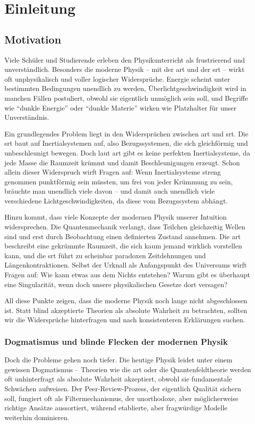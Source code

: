 \chapter{Einleitung}
\section{Motivation}
Viele Schüler und Studierende erleben den Physikunterricht als frustrierend und unverständlich. Besonders die moderne Physik – mit der \gls{art}
und der \gls{srt} – wirkt oft unphysikalisch und voller logischer Widersprüche. Energie scheint unter bestimmten Bedingungen unendlich zu werden,
Überlichtgeschwindigkeit wird in manchen Fällen postuliert, obwohl sie eigentlich unmöglich sein soll, und Begriffe wie \enquote{dunkle Energie} oder \enquote{dunkle Materie} wirken wie
Platzhalter für unser Unverständnis.

Ein grundlegendes Problem liegt in den Widersprüchen zwischen \gls{art} und \gls{srt}. Die \gls{srt} baut auf Inertialsystemen auf, also Bezugssystemen, die sich gleichförmig und unbeschleunigt
bewegen. Doch laut \gls{art} gibt es keine perfekten Inertialsysteme, da jede Masse die Raumzeit krümmt und damit Beschleunigungen erzeugt. Schon allein dieser Widerspruch wirft
Fragen auf: Wenn Inertialsysteme streng genommen punktförmig sein müssten, um frei von jeder Krümmung zu sein, bräuchte man unendlich viele davon – und damit auch unendlich
viele verschiedene Lichtgeschwindigkeiten, da diese vom Bezugssystem abhängt.

Hinzu kommt, dass viele Konzepte der modernen Physik unserer Intuition widersprechen. Die Quantenmechanik verlangt, dass Teilchen gleichzeitig Wellen sind und erst durch
Beobachtung einen definierten Zustand annehmen. Die \gls{art} beschreibt eine gekrümmte Raumzeit, die sich kaum jemand wirklich vorstellen kann, und die \gls{srt} führt zu scheinbar
paradoxen Zeitdehnungen und Längenkontraktionen. Selbst der Urknall als Anfangspunkt des Universums wirft Fragen auf: Wie kann etwas aus dem Nichts entstehen? Warum gibt es
überhaupt eine Singularität, wenn doch unsere physikalischen Gesetze dort versagen?

All diese Punkte zeigen, dass die moderne Physik noch lange nicht abgeschlossen ist. Statt blind akzeptierte Theorien als absolute Wahrheit zu betrachten, sollten wir die
Widersprüche hinterfragen und nach konsistenteren Erklärungen suchen.

\subsection{Dogmatismus und blinde Flecken der modernen Physik}
Doch die Probleme gehen noch tiefer. Die heutige Physik leidet unter einem gewissen Dogmatismus – Theorien wie die \gls{art} oder die Quantenfeldtheorie werden oft unhinterfragt
als absolute Wahrheit akzeptiert, obwohl sie fundamentale Schwächen aufweisen. Der Peer-Review-Prozess, der eigentlich Qualität sichern soll, fungiert oft als Filtermechanismus,
der unorthodoxe, aber möglicherweise richtige Ansätze aussortiert, während etablierte, aber fragwürdige Modelle weiterhin dominieren.

